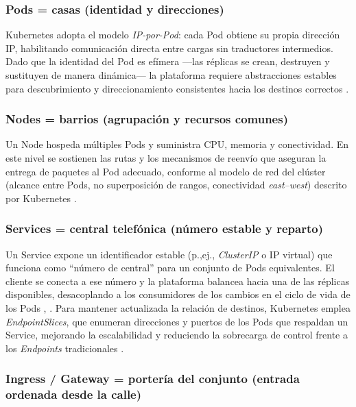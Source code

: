 \documentclass[journal]{IEEEtran}
\begin{document}
\medskip
\subsubsection{Pods = casas (identidad y direcciones)}

Kubernetes adopta el modelo \emph{IP-por-Pod}: cada Pod obtiene su propia dirección IP, habilitando comunicación directa entre cargas sin traductores intermedios. Dado que la identidad del Pod es efímera —las réplicas se crean, destruyen y sustituyen de manera dinámica— la plataforma requiere abstracciones estables para descubrimiento y direccionamiento consistentes hacia los destinos correctos \cite{ref2}.

\medskip
\subsubsection{Nodes = barrios (agrupación y recursos comunes)}

Un Node hospeda múltiples Pods y suministra CPU, memoria y conectividad. En este nivel se sostienen las rutas y los mecanismos de reenvío que aseguran la entrega de paquetes al Pod adecuado, conforme al modelo de red del clúster (alcance entre Pods, no superposición de rangos, conectividad \emph{east--west}) descrito por Kubernetes \cite{ref2}.

\medskip
\subsubsection{Services = central telefónica (número estable y reparto)}

Un Service expone un identificador estable (p.,ej., \emph{ClusterIP} o IP virtual) que funciona como “número de central” para un conjunto de Pods equivalentes. El cliente se conecta a ese número y la plataforma balancea hacia una de las réplicas disponibles, desacoplando a los consumidores de los cambios en el ciclo de vida de los Pods \cite{ref3}, \cite{ref13}.
Para mantener actualizada la relación de destinos, Kubernetes emplea \emph{EndpointSlices}, que enumeran direcciones y puertos de los Pods que respaldan un Service, mejorando la escalabilidad y reduciendo la sobrecarga de control frente a los \emph{Endpoints} tradicionales \cite{ref1}.

\medskip
\subsubsection{Ingress / Gateway = portería del conjunto (entrada ordenada desde la calle)}
\end{document}
